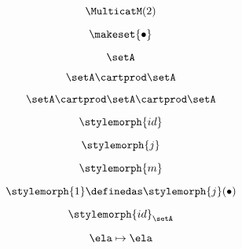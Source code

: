 \begin{forslides}
    \begin{equation}
        \label{eq:slides_multicategories_35}
       \MulticatM(2)
    \end{equation}
    
     \begin{equation}
        \label{eq:slides_multicategories_36}
       \makeset{ \bullet }
    \end{equation}
    
     \begin{equation}
        \label{eq:slides_multicategories_37}
      \setA 
    \end{equation}
    
     \begin{equation}
        \label{eq:slides_multicategories_38}
      \setA \cartprod \setA
    \end{equation}
    
    \begin{equation}
        \label{eq:slides_multicategories_39}
       \setA \cartprod \setA \cartprod \setA
    \end{equation}
    
     \begin{equation}
        \label{eq:slides_multicategories_40}
       \stylemorph{id}
    \end{equation}
    
    \begin{equation}
        \label{eq:slides_multicategories_41}
       \stylemorph{j}
    \end{equation}
    
     \begin{equation}
        \label{eq:slides_multicategories_42}
       \stylemorph{m}
    \end{equation}
    
     \begin{equation}
        \label{eq:slides_multicategories_43}
      \stylemorph{1} \definedas \stylemorph{j}(\bullet)
    \end{equation}
    
     \begin{equation}
        \label{eq:slides_multicategories_44}
      \stylemorph{id}_{\setA}
    \end{equation}
    
    \begin{equation}
        \label{eq:slides_multicategories_45}
       \ela \mapsto \ela
    \end{equation}
    

\end{forslides}
